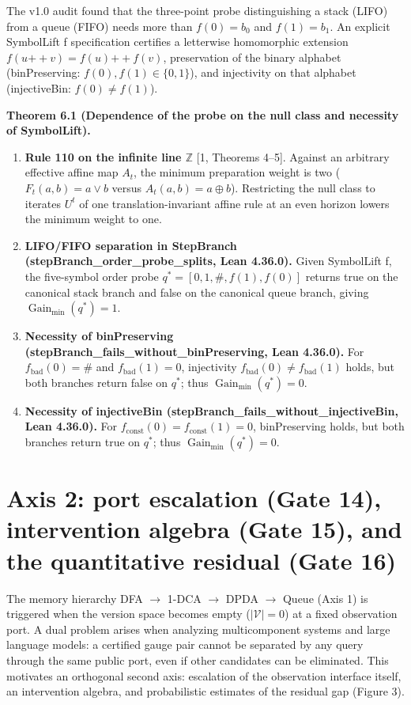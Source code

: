 \documentclass[11pt,a4paper]{article}
\begin{document}
The v1.0 audit found that the three-point probe distinguishing a stack (LIFO) from a queue (FIFO) needs more than \(f(0)=b_0\) and \(f(1)=b_1\). An explicit SymbolLift f specification certifies a letterwise homomorphic extension \(f(u\mathbin{++}v)=f(u)\mathbin{++}f(v)\), preservation of the binary alphabet (binPreserving: \(f(0),f(1)\in\{0,1\}\)), and injectivity on that alphabet (injectiveBin: \(f(0)\ne f(1)\)).

\textbf{Theorem 6.1 (Dependence of the probe on the null class and necessity of SymbolLift).}

\begin{enumerate}
\item \textbf{Rule 110 on the infinite line \(\mathbb Z\)} [1, Theorems 4–5]. Against an arbitrary effective affine map \(A_t\), the minimum preparation weight is two (\(F_t(a,b)=a\lor b\) versus \(A_t(a,b)=a\oplus b\)). Restricting the null class to iterates \(U^t\) of one translation-invariant affine rule at an even horizon lowers the minimum weight to one.
\item \textbf{LIFO/FIFO separation in StepBranch (stepBranch\_\allowbreak order\_\allowbreak probe\_\allowbreak splits, Lean 4.36.0).} Given SymbolLift f, the five-symbol order probe \(q^*=[0,1,\#,f(1),f(0)]\) returns true on the canonical stack branch and false on the canonical queue branch, giving \(\operatorname{Gain}_{\min}(q^*)=1\).
\item \textbf{Necessity of binPreserving (stepBranch\_\allowbreak fails\_\allowbreak without\_\allowbreak binPreserving, Lean 4.36.0).} For \(f_{\mathrm{bad}}(0)=\#\) and \(f_{\mathrm{bad}}(1)=0\), injectivity \(f_{\mathrm{bad}}(0)\ne f_{\mathrm{bad}}(1)\) holds, but both branches return false on \(q^*\); thus \(\operatorname{Gain}_{\min}(q^*)=0\).
\item \textbf{Necessity of injectiveBin (stepBranch\_\allowbreak fails\_\allowbreak without\_\allowbreak injectiveBin, Lean 4.36.0).} For \(f_{\mathrm{const}}(0)=f_{\mathrm{const}}(1)=0\), binPreserving holds, but both branches return true on \(q^*\); thus \(\operatorname{Gain}_{\min}(q^*)=0\).

\end{enumerate}
\section{Axis 2: port escalation (Gate 14), intervention algebra (Gate 15), and the quantitative residual (Gate 16)}

The memory hierarchy DFA \(\to\) 1-DCA \(\to\) DPDA \(\to\) Queue (Axis 1) is triggered when the version space becomes empty (\(|\mathcal V|=0\)) at a fixed observation port. A dual problem arises when analyzing multicomponent systems and large language models: a certified gauge pair cannot be separated by any query through the same public port, even if other candidates can be eliminated. This motivates an orthogonal second axis: escalation of the observation interface itself, an intervention algebra, and probabilistic estimates of the residual gap (Figure 3).
\end{document}
